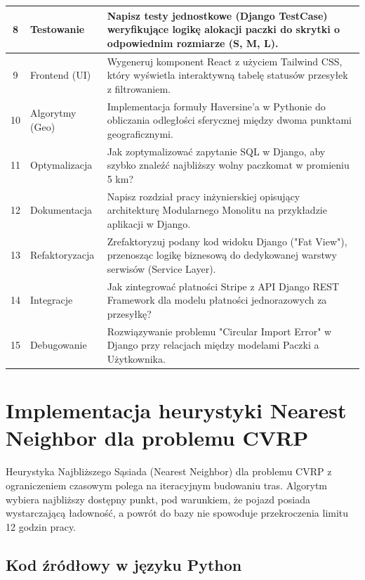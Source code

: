 \begin{table}[H]
\begin{tabular}{|c|p{3cm}|p{9cm}|}
        8 & Testowanie & Napisz testy jednostkowe (Django TestCase) weryfikujące logikę alokacji paczki do skrytki o odpowiednim rozmiarze (S, M, L). \\ \hline
        9 & Frontend (UI) & Wygeneruj komponent React z użyciem Tailwind CSS, który wyświetla interaktywną tabelę statusów przesyłek z filtrowaniem. \\ \hline
        10 & Algorytmy (Geo) & Implementacja formuły Haversine'a w Pythonie do obliczania odległości sferycznej między dwoma punktami geograficznymi. \\ \hline
        11 & Optymalizacja & Jak zoptymalizować zapytanie SQL w Django, aby szybko znaleźć najbliższy wolny paczkomat w promieniu 5 km? \\ \hline
        12 & Dokumentacja & Napisz rozdział pracy inżynierskiej opisujący architekturę Modularnego Monolitu na przykładzie aplikacji w Django. \\ \hline
        13 & Refaktoryzacja & Zrefaktoryzuj podany kod widoku Django ("Fat View"), przenosząc logikę biznesową do dedykowanej warstwy serwisów (Service Layer). \\ \hline
        14 & Integracje & Jak zintegrować płatności Stripe z API Django REST Framework dla modelu płatności jednorazowych za przesyłkę? \\ \hline
        15 & Debugowanie & Rozwiązywanie problemu "Circular Import Error" w Django przy relacjach między modelami Paczki a Użytkownika. \\ \hline
    \end{tabular}
\end{table}
\clearpage

\section{Implementacja heurystyki Nearest Neighbor dla problemu CVRP}

Heurystyka Najbliższego Sąsiada (Nearest Neighbor) dla problemu CVRP z ograniczeniem czasowym polega na iteracyjnym budowaniu tras. Algorytm wybiera najbliższy dostępny punkt, pod warunkiem, że pojazd posiada wystarczającą ładowność, a powrót do bazy nie spowoduje przekroczenia limitu 12 godzin pracy.

\subsection*{Kod źródłowy w języku Python}

